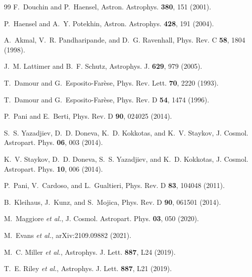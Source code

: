 \documentclass[twocolumn,showpacs,preprintnumbers,amsmath,amssymb,prd]{revtex4-2}
\begin{document}
\begin{thebibliography}{99}
F.~Douchin and P.~Haensel,
Astron. Astrophys. \textbf{380}, 151 (2001).

P.~Haensel and A.~Y. Potekhin,
Astron. Astrophys. \textbf{428}, 191 (2004).

A.~Akmal, V.~R. Pandharipande, and D.~G. Ravenhall,
Phys. Rev. C \textbf{58}, 1804 (1998).

J.~M. Lattimer and B.~F. Schutz,
Astrophys. J. \textbf{629}, 979 (2005).

T.~Damour and G.~Esposito-Far\`ese,
Phys. Rev. Lett. \textbf{70}, 2220 (1993).

T.~Damour and G.~Esposito-Far\`ese,
Phys. Rev. D \textbf{54}, 1474 (1996).

P.~Pani and E.~Berti,
Phys. Rev. D \textbf{90}, 024025 (2014).

S.~S. Yazadjiev, D.~D. Doneva, K.~D. Kokkotas, and K.~V. Staykov,
J. Cosmol. Astropart. Phys. \textbf{06}, 003 (2014).

K.~V. Staykov, D.~D. Doneva, S.~S. Yazadjiev, and K.~D. Kokkotas,
J. Cosmol. Astropart. Phys. \textbf{10}, 006 (2014).

P.~Pani, V.~Cardoso, and L.~Gualtieri,
Phys. Rev. D \textbf{83}, 104048 (2011).

B.~Kleihaus, J.~Kunz, and S.~Mojica,
Phys. Rev. D \textbf{90}, 061501 (2014).

M.~Maggiore \textit{et al.},
J. Cosmol. Astropart. Phys. \textbf{03}, 050 (2020).

M.~Evans \textit{et al.},
arXiv:2109.09882 (2021).

M.~C. Miller \textit{et al.},
Astrophys. J. Lett. \textbf{887}, L24 (2019).

T.~E. Riley \textit{et al.},
Astrophys. J. Lett. \textbf{887}, L21 (2019).

\end{thebibliography}
\end{document}
